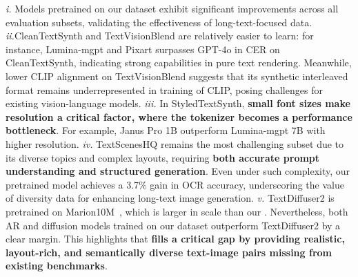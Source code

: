 \emph{i.} Models pretrained on our dataset exhibit significant improvements across all evaluation subsets, validating the effectiveness of long-text-focused data. 
\emph{ii.}CleanTextSynth and TextVisionBlend are relatively easier to learn: for instance, Lumina-mgpt and Pixart surpasses GPT-4o in CER on CleanTextSynth, indicating strong capabilities in pure text rendering. Meanwhile, lower CLIP alignment on TextVisionBlend suggests that its synthetic interleaved format remains underrepresented in training of CLIP, posing challenges for existing vision-language models. 
\emph{iii.}
In StyledTextSynth, \textbf{small font sizes make resolution a critical factor, where the tokenizer becomes a performance bottleneck}.
For example, Janus Pro 1B outperform Lumina-mgpt 7B with higher resolution.
\emph{iv.}
TextScenesHQ remains the most challenging subset due to its diverse topics and complex layouts, requiring \textbf{both accurate prompt understanding and structured generation}. Even under such complexity, our pretrained model achieves a 3.7\% gain in OCR accuracy, underscoring the value of diversity data for enhancing long-text image generation.
\emph{v.}
TextDiffuser2 is pretrained on Marion10M~\cite{textdiffuser2}, which is larger in scale than our \DatasetName. 
Nevertheless, both AR and diffusion models trained on our dataset outperform TextDiffuser2 by a clear margin. 
This highlights that \textbf{\DatasetName fills a critical gap by providing realistic, layout-rich, and semantically diverse text-image pairs missing from existing benchmarks}. 
